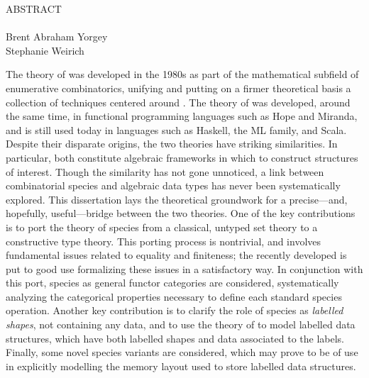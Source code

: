 
\begin{doublespace}

\begin{centering}
{\Large ABSTRACT} \\
\Title \\
Brent Abraham Yorgey \\
Stephanie Weirich \\
\end{centering}

\vspace*{1in}

The theory of  was developed in the 1980s
as part of the mathematical subfield of enumerative combinatorics,
unifying and putting on a firmer theoretical basis a collection of
techniques centered around .  The theory of
 was developed, around the same time, in
functional programming languages such as Hope and Miranda, and is
still used today in languages such as Haskell, the ML family, and
Scala.  Despite their disparate origins, the two theories have striking
similarities. In particular, both constitute algebraic frameworks in
which to construct structures of interest.  Though the similarity has
not gone unnoticed, a link between combinatorial species and algebraic
data types has never been systematically explored.  This dissertation
lays the theoretical groundwork for a precise---and, hopefully,
useful---bridge between the two theories.  One of the key
contributions is to port the theory of species from a classical,
untyped set theory to a constructive type theory. This porting process
is nontrivial, and involves fundamental issues related to equality and
finiteness; the recently developed  is put
to good use formalizing these issues in a satisfactory way.  In
conjunction with this port, species as general functor categories are
considered, systematically analyzing the categorical properties
necessary to define each standard species operation.  Another key
contribution is to clarify the role of species as \emph{labelled
  shapes}, not containing any data, and to use the theory of
 to model labelled data structures, which have
both labelled shapes and data associated to the labels.  Finally, some
novel species variants are considered, which may prove to be of use in
explicitly modelling the memory layout used to store labelled data
structures.

\end{doublespace}
